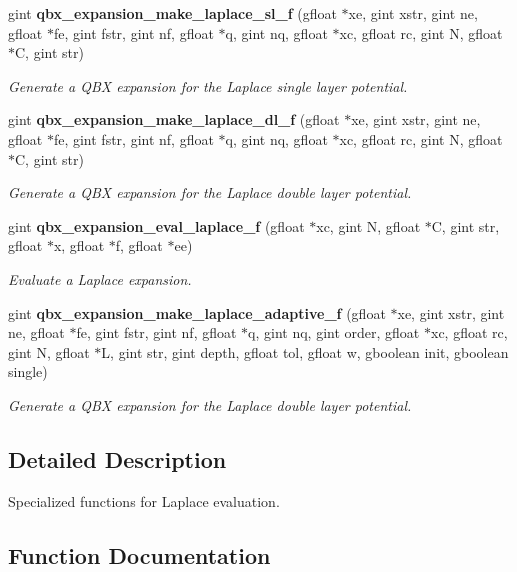 \begin{DoxyCompactItemize}
gint {\bf qbx\+\_\+expansion\+\_\+make\+\_\+laplace\+\_\+sl\+\_\+f} (gfloat $\ast$xe, gint xstr, gint ne, gfloat $\ast$fe, gint fstr, gint nf, gfloat $\ast$q, gint nq, gfloat $\ast$xc, gfloat rc, gint N, gfloat $\ast$C, gint str)
\begin{DoxyCompactList}\small\item\em Generate a Q\+B\+X expansion for the Laplace single layer potential. \end{DoxyCompactList}\item 
gint {\bf qbx\+\_\+expansion\+\_\+make\+\_\+laplace\+\_\+dl\+\_\+f} (gfloat $\ast$xe, gint xstr, gint ne, gfloat $\ast$fe, gint fstr, gint nf, gfloat $\ast$q, gint nq, gfloat $\ast$xc, gfloat rc, gint N, gfloat $\ast$C, gint str)
\begin{DoxyCompactList}\small\item\em Generate a Q\+B\+X expansion for the Laplace double layer potential. \end{DoxyCompactList}\item 
gint {\bf qbx\+\_\+expansion\+\_\+eval\+\_\+laplace\+\_\+f} (gfloat $\ast$xc, gint N, gfloat $\ast$C, gint str, gfloat $\ast$x, gfloat $\ast$f, gfloat $\ast$ee)
\begin{DoxyCompactList}\small\item\em Evaluate a Laplace expansion. \end{DoxyCompactList}\item 
gint {\bf qbx\+\_\+expansion\+\_\+make\+\_\+laplace\+\_\+adaptive\+\_\+f} (gfloat $\ast$xe, gint xstr, gint ne, gfloat $\ast$fe, gint fstr, gint nf, gfloat $\ast$q, gint nq, gint order, gfloat $\ast$xc, gfloat rc, gint N, gfloat $\ast$L, gint str, gint depth, gfloat tol, gfloat w, gboolean init, gboolean single)
\begin{DoxyCompactList}\small\item\em Generate a Q\+B\+X expansion for the Laplace double layer potential. \end{DoxyCompactList}\end{DoxyCompactItemize}


\subsection{Detailed Description}
Specialized functions for Laplace evaluation. 



\subsection{Function Documentation}

